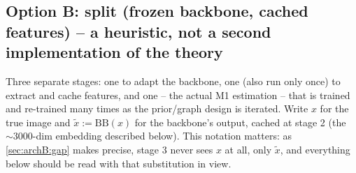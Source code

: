 \subsection[Option B: split]{Option B: split (frozen backbone, cached features) -- a heuristic, not a
second implementation of the theory}
\label{sec:archB}
Three separate stages: one to adapt the backbone, one (also run only once) to extract and cache
features, and one -- the actual M1 estimation -- that is trained and re-trained many times as the
prior/graph design is iterated. Write $x$ for the true image and $\tilde x:=\mathrm{BB}(x)$ for the
backbone's output, cached at stage 2 (the $\sim\!3000$-dim embedding described below). This notation
matters: as \cref{sec:archB:gap} makes precise, stage 3 never sees $x$ at all, only $\tilde x$, and
everything below should be read with that substitution in view.
